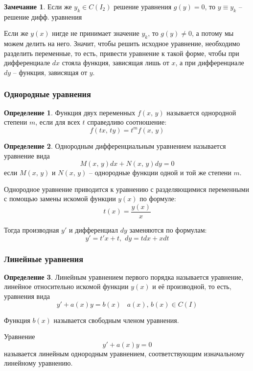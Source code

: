 \documentclass[a4paper,12pt]{article}
\theoremstyle{plain}
\theoremstyle{definition}
\newtheorem{definition}{Определение}[section]
\newtheorem*{note}{Замечание}
\theoremstyle{remark}
\begin{document}
\begin{note}
	Если же $y_k \in C(I_2)$ решение уравнения $g(y) = 0$, то $y \equiv y_k$ -- решение дифф. уравнения
\end{note}

Если же $y(x)$ нигде не принимает значение $y_k$, то $g(y) \neq 0$, а потому мы можем делить на него. Значит, чтобы решить исходное уравнение, необходимо разделить переменные, то есть, привести уравнение к такой форме, чтобы при дифференциале $dx$ стояла функция, зависящая лишь от $x$, а при дифференциале $dy$ -- функция, зависящая от $y$.

\subsubsection*{Однородные уравнения}
\begin{definition}
	Функция двух переменных $f(x,\,y)$ называется однородной степени $m$, если для всех $t$ справедливо соотношение:
	\[f(tx,\,ty) = t^mf(x,\,y)\]
\end{definition}

\begin{definition}
	Однородным дифференциальным уравнением называется уравнение вида
	\[M(x,\,y)dx + N(x,\,y)dy = 0\]
	если $M(x,\,y)$ и $N(x,\,y)$ -- однородные функции одной и той же степени $m$.
\end{definition}

Однородное уравнение приводится к уравнению с разделяющимися переменными с помощью замены искомой функции $y(x)$ по формуле:
\[t(x) = \frac{y(x)}{x}\]

Тогда производная $y'$ и дифференциал $dy$ заменяются по формулам:
\[y' = t'x + t,\,\, dy = tdx + xdt\]

\subsubsection*{Линейные уравнения}
\begin{definition}
	Линейным уравнением первого порядка называется уравнение, линейное относительно искомой функции $y(x)$ и её производной, то есть, уравнения вида
	\[y' + a(x)y = b(x)\;\;\; a(x),\,b(x) \in C(I)\]

	Функция $b(x)$ называется свободным членом уравнения.

	Уравнение \[y' + a(x)y = 0\] называется линейным однородным уравнением, соответствующим изначальному линейному уравнению.
\end{definition}
\end{document}
